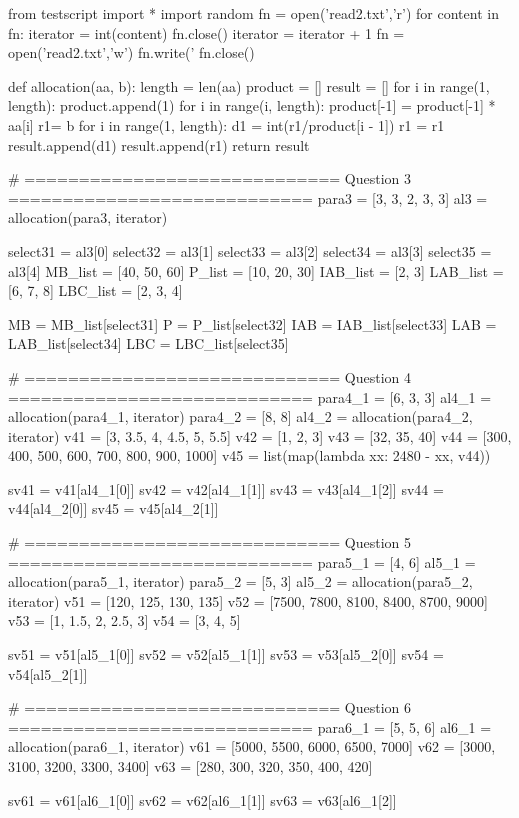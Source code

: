 \documentclass[a4paper,11pt]{article}
\begin{document}
\begin{pycode}
	from testscript import *
	import random
	fn = open('read2.txt','r')
	for content in fn:
		iterator = int(content)
	fn.close()
	iterator = iterator + 1
	fn = open('read2.txt','w')
	fn.write('%
	fn.close()
	
	def allocation(aa, b):
		length = len(aa)
		product = []
		result = []
		for i in range(1, length):
			product.append(1)
			for i in range(i, length):
				product[-1] = product[-1] * aa[i]
		r1= b
		for i in range(1, length):
			d1 = int(r1/product[i - 1])
			r1 = r1%
			result.append(d1)
		result.append(r1)
		return result
	
	# ============================= Question 3 ============================
	para3 = [3, 3, 2, 3, 3]
	al3 = allocation(para3, iterator)
		
	select31 = al3[0]
	select32 = al3[1]
	select33 = al3[2]
	select34 = al3[3]
	select35 = al3[4]
	MB_list = [40, 50, 60]
	P_list = [10, 20, 30]
	IAB_list = [2, 3]
	LAB_list = [6, 7, 8]
	LBC_list = [2, 3, 4]
	
	MB = MB_list[select31]
	P = P_list[select32]
	IAB = IAB_list[select33]
	LAB = LAB_list[select34]
	LBC = LBC_list[select35]
	
	# ============================= Question 4 ============================
	para4_1 = [6, 3, 3]
	al4_1 = allocation(para4_1, iterator)
	para4_2 = [8, 8]
	al4_2 = allocation(para4_2, iterator)
	v41 = [3, 3.5, 4, 4.5, 5, 5.5]
	v42 = [1, 2, 3]
	v43 = [32, 35, 40]
	v44 = [300, 400, 500, 600, 700, 800, 900, 1000]
	v45 = list(map(lambda xx: 2480 - xx, v44))
	
	sv41 = v41[al4_1[0]]
	sv42 = v42[al4_1[1]]
	sv43 = v43[al4_1[2]]
	sv44 = v44[al4_2[0]]
	sv45 = v45[al4_2[1]]
	
	# ============================= Question 5 ============================
	para5_1 = [4, 6]
	al5_1 = allocation(para5_1, iterator)
	para5_2 = [5, 3]
	al5_2 = allocation(para5_2, iterator)
	v51 = [120, 125, 130, 135]
	v52 = [7500, 7800, 8100, 8400, 8700, 9000]
	v53 = [1, 1.5, 2, 2.5, 3]
	v54 = [3, 4, 5]
	
	sv51 = v51[al5_1[0]]
	sv52 = v52[al5_1[1]]
	sv53 = v53[al5_2[0]]
	sv54 = v54[al5_2[1]]
	
	# ============================= Question 6 ============================
	para6_1 = [5, 5, 6]
	al6_1 = allocation(para6_1, iterator)
	v61 = [5000, 5500, 6000, 6500, 7000]
	v62 = [3000, 3100, 3200, 3300, 3400]
	v63 = [280, 300, 320, 350, 400, 420]
	
	sv61 = v61[al6_1[0]]
	sv62 = v62[al6_1[1]]
	sv63 = v63[al6_1[2]]
	

\end{pycode}
\end{document}
